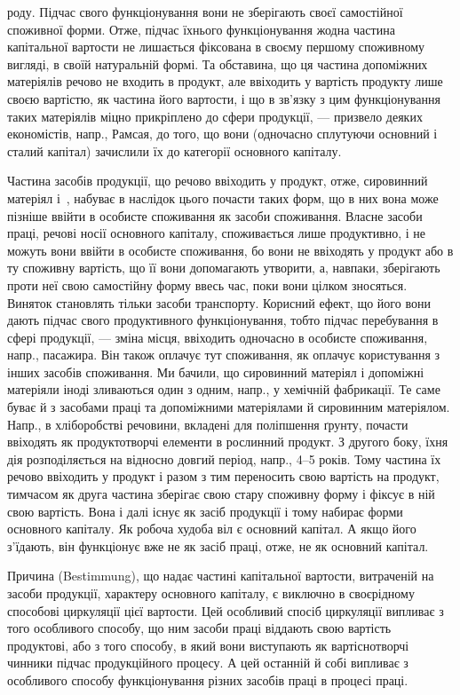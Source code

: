 \parcont{}  %
роду. Підчас свого функціонування вони не зберігають своєї самостійної
споживної форми. Отже, підчас їхнього функціонування жодна частина
капітальної вартости не лишається фіксована в своєму першому споживному
вигляді, в своїй натуральній формі. Та обставина, що ця частина
допоміжних матеріялів речово не входить в продукт, але ввіходить у
вартість продукту лише своєю вартістю, як частина його вартости, і що
в зв’язку з цим функціонування таких матеріялів міцно прикріплено до
сфери продукції, — призвело деяких економістів, напр., Рамсая, до того,
що вони (одночасно сплутуючи основний і сталий капітал) зачислили їх
до категорії основного капіталу.

Частина засобів продукції, що речово ввіходить у продукт, отже,
сировинний матеріял і~, набуває в наслідок цього почасти таких
форм, що в них вона може пізніше ввійти в особисте споживання як
засоби споживання. Власне засоби праці, речові носії основного капіталу,
споживається лише продуктивно, і не можуть вони ввійти в особисте
споживання, бо вони не ввіходять у продукт або в ту споживну вартість,
що її вони допомагають утворити, а, навпаки, зберігають проти
неї свою самостійну форму ввесь час, поки вони цілком зносяться. Виняток
становлять тільки засоби транспорту. Корисний ефект, що його
вони дають підчас свого продуктивного функціонування, тобто підчас
перебування в сфері продукції, — зміна місця, ввіходить одночасно в особисте
споживання, напр., пасажира. Він також оплачує тут споживання,
як оплачує користування з інших засобів споживання. Ми бачили, що
сировинний матеріял і допоміжні матеріяли іноді зливаються один з
одним, напр., у хемічній фабрикації. Те саме буває й з засобами праці
та допоміжними матеріялами й сировинним матеріялом. Напр., в хліборобстві
речовини, вкладені для поліпшення ґрунту, почасти ввіходять як продуктотворчі
елементи в рослинний продукт. З другого боку, їхня дія
розподіляється на відносно довгий період, напр., 4--5 років. Тому частина
їх речово ввіходить у продукт і разом з тим переносить свою
вартість на продукт, тимчасом як друга частина зберігає свою стару
споживну форму і фіксує в ній свою вартість. Вона і далі існує як засіб
продукції і тому набирає форми основного капіталу. Як робоча худоба
віл є основний капітал. А якщо його з’їдають, він функціонує вже не як
засіб праці, отже, не як основний капітал.

Причина (Bestimmung), що надає частині капітальної вартости, витраченій
на засоби продукції, характеру основного капіталу, є виключно в
своєрідному способові циркуляції цієї вартости. Цей особливий спосіб
циркуляції випливає з того особливого способу, що ним засоби праці
віддають свою вартість продуктові, або з того способу, в який вони виступають
як вартіснотворчі чинники підчас продукційного процесу. А цей останній
й собі випливає з особливого способу функціонування різних засобів
праці в процесі праці.

